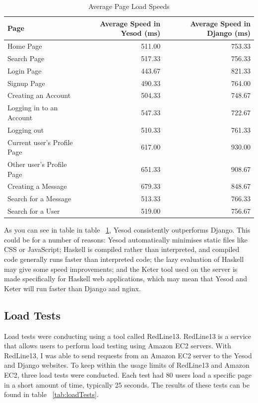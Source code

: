 \begin{table}[H]
	\caption{Average Page Load Speeds}
	\begin{center}
		\begin{tabular}{ | l | r | r |}
			\hline
			Page & Average Speed in Yesod (ms) & Average Speed in Django (ms) \\
			\hline
			Home Page & 511.00 & 753.33 \\
			Search Page & 517.33 & 756.33 \\
			Login Page & 443.67 & 821.33 \\
			Signup Page & 490.33 & 764.00 \\
			Creating an Account & 504.33 & 748.67 \\
			Logging in to an Account & 547.33 & 722.67 \\
			Logging out & 510.33 & 761.33 \\
			Current user's Profile Page & 617.00 & 930.00 \\
			Other user's Profile Page & 651.33 & 908.67 \\
			Creating a Message & 679.33 & 848.67 \\
			Search for a Message & 513.33 & 766.33 \\
			Search for a User & 519.00 & 756.67 \\
			\hline
		\end{tabular}
	\end{center}
	\label{tab:pageLoadAverageSpeeds}
\end{table}

As you can see in table in table ~\ref{tab:pageLoadAverageSpeeds}, Yesod
consistently outperforms Django. This could be for a number of reasons:
Yesod automatically minimises static files like CSS or JavaScript;
Haskell is compiled rather than interpreted, and compiled code generally
runs faster than interpreted code; the lazy evaluation of Haskell may
give some speed improvements; and the Keter tool used on the server
is made specifically for Haskell web applications, which may mean that
Yesod and Keter will run faster than Django and nginx.

\subsection{Load Tests}

Load tests were conducting using a tool called RedLine13. RedLine13 is
a service that allows users to perform load testing using Amazon EC2
servers. With RedLine13, I was able to send requests from an Amazon
EC2 server to the Yesod and Django websites. To keep within the
usage limits of RedLine13 and Amazon EC2, three load tests were
conducted. Each test had 80 users load a specific page in a short
amount of time, typically 25 seconds. The results of these tests can
be found in table ~\ref{tab:loadTests}.

